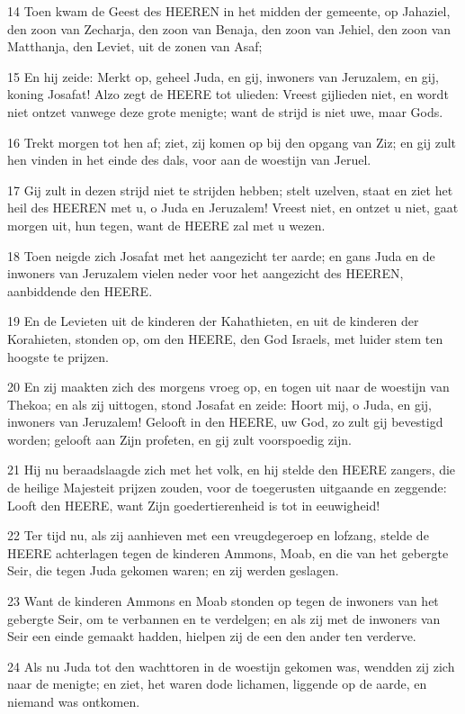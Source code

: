 \par 14 Toen kwam de Geest des HEEREN in het midden der gemeente, op Jahaziel, den zoon van Zecharja, den zoon van Benaja, den zoon van Jehiel, den zoon van Matthanja, den Leviet, uit de zonen van Asaf;
\par 15 En hij zeide: Merkt op, geheel Juda, en gij, inwoners van Jeruzalem, en gij, koning Josafat! Alzo zegt de HEERE tot ulieden: Vreest gijlieden niet, en wordt niet ontzet vanwege deze grote menigte; want de strijd is niet uwe, maar Gods.
\par 16 Trekt morgen tot hen af; ziet, zij komen op bij den opgang van Ziz; en gij zult hen vinden in het einde des dals, voor aan de woestijn van Jeruel.
\par 17 Gij zult in dezen strijd niet te strijden hebben; stelt uzelven, staat en ziet het heil des HEEREN met u, o Juda en Jeruzalem! Vreest niet, en ontzet u niet, gaat morgen uit, hun tegen, want de HEERE zal met u wezen.
\par 18 Toen neigde zich Josafat met het aangezicht ter aarde; en gans Juda en de inwoners van Jeruzalem vielen neder voor het aangezicht des HEEREN, aanbiddende den HEERE.
\par 19 En de Levieten uit de kinderen der Kahathieten, en uit de kinderen der Korahieten, stonden op, om den HEERE, den God Israels, met luider stem ten hoogste te prijzen.
\par 20 En zij maakten zich des morgens vroeg op, en togen uit naar de woestijn van Thekoa; en als zij uittogen, stond Josafat en zeide: Hoort mij, o Juda, en gij, inwoners van Jeruzalem! Gelooft in den HEERE, uw God, zo zult gij bevestigd worden; gelooft aan Zijn profeten, en gij zult voorspoedig zijn.
\par 21 Hij nu beraadslaagde zich met het volk, en hij stelde den HEERE zangers, die de heilige Majesteit prijzen zouden, voor de toegerusten uitgaande en zeggende: Looft den HEERE, want Zijn goedertierenheid is tot in eeuwigheid!
\par 22 Ter tijd nu, als zij aanhieven met een vreugdegeroep en lofzang, stelde de HEERE achterlagen tegen de kinderen Ammons, Moab, en die van het gebergte Seir, die tegen Juda gekomen waren; en zij werden geslagen.
\par 23 Want de kinderen Ammons en Moab stonden op tegen de inwoners van het gebergte Seir, om te verbannen en te verdelgen; en als zij met de inwoners van Seir een einde gemaakt hadden, hielpen zij de een den ander ten verderve.
\par 24 Als nu Juda tot den wachttoren in de woestijn gekomen was, wendden zij zich naar de menigte; en ziet, het waren dode lichamen, liggende op de aarde, en niemand was ontkomen.
